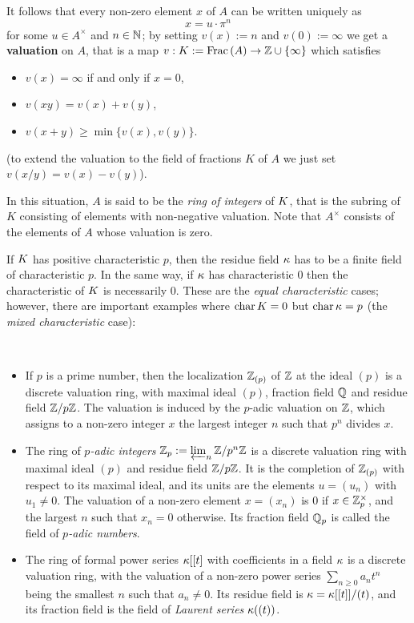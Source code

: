 \documentclass[a4paper, oneside]{memoir}
\begin{document}
It follows that every non-zero element $x$ of $A$ can be written uniquely as
\begin{equation}\label{eq:DVR}
	x=u\cdot\pi^n
\end{equation}
for some $u\in A^\times$ and $n\in\mathbb{N}$; by setting $v(x):=n$ and $v(0):=\infty$ we get a \textbf{valuation} on $A$, that is a map $v:K:=\operatorname{Frac}{(A)}\to\mathbb{Z}\cup\{\infty\}$ which satisfies
\begin{itemize}
	\item $v(x)=\infty$ if and only if $x=0$,
	\item $v(xy)=v(x)+v(y)$,
	\item $v(x+y)\geq\min\{v(x),v(y)\}$.
\end{itemize}
(to extend the valuation to the field of fractions $K$ of $A$ we just set $v(x/y)=v(x)-v(y)$).

In this situation, $A$ is said to be the \textit{ring of integers} of $K$, that is the subring of $K$ consisting of elements with non-negative valuation. Note that $A^\times$ consists
of the elements of $A$ whose valuation is zero.

\begin{remark}
	If \(K\) has positive characteristic \(p\), then the residue field \(\kappa\) has to be a finite field of characteristic \(p\). In the same way, if \(\kappa\) has characteristic \(0\) then
	the characteristic of \(K\) is necessarily \(0\). These are the \textit{equal characteristic} cases; however, there are important examples where \(\operatorname{char}{K}=0\)
	but \(\operatorname{char}{\kappa}=p\) (the \textit{mixed characteristic} case):
\end{remark}


\begin{example}\label{ex:DVR}\
	\begin{itemize}
		\item If $p$ is a prime number, then the localization $\mathbb{Z}_{(p)}$ of $\mathbb{Z}$ at the ideal $(p)$ is a discrete valuation ring, with maximal ideal $(p)$, fraction field $\mathbb{Q}$ and residue field
		      $\mathbb{Z}/p\mathbb{Z}$. The valuation is induced by the $p$-adic valuation on $\mathbb{Z}$, which assigns to a non-zero integer $x$ the largest integer $n$ such that $p^n$ divides $x$.
		\item The ring of \textit{$p$-adic integers} $\mathbb{Z}_p:=\varprojlim_n{\mathbb{Z}/p^n\mathbb{Z}}$ is a discrete valuation ring with maximal ideal $(p)$ and residue field $\mathbb{Z}/p\mathbb{Z}$. It is the completion of
		      $\mathbb{Z}_{(p)}$ with respect to its maximal ideal, and its units are the elements $u=(u_n)$ with $u_1\neq 0$. The valuation of a non-zero element $x=(x_n)$ is $0$ if
		      $x\in\mathbb{Z}_p^\times$, and the largest $n$ such that $x_n= 0$ otherwise. Its fraction field $\mathbb{Q}_p$ is called the field of \textit{$p$-adic numbers}.
		\item The ring of formal power series $\kappa[[t]$ with coefficients in a field $\kappa$ is a discrete valuation ring, with the valuation of a non-zero power series $\sum_{n\geq
				      0}{a_nt^n}$ being the smallest $n$ such that $a_n\neq 0$. Its residue field is $\kappa=\kappa[[t]]/(t)$, and its fraction field is the field of \textit{Laurent series} $\kappa((t))$.
	\end{itemize}
\end{example}
\end{document}
